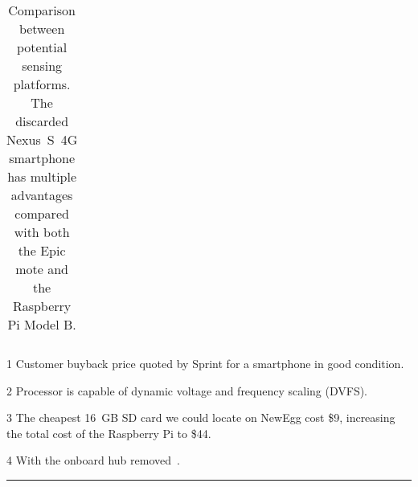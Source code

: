 \begin{table*}[t]
\begin{threeparttable}
{\begin{tabularx}{\textwidth}{rXXX}
\end{tabularx}
}
{\tiny
\begin{tablenotes}
\item [1] Customer buyback price quoted by Sprint for a smartphone in good
condition.
\item [2] Processor is capable of dynamic voltage and frequency scaling
(DVFS).
\item [3] The cheapest 16~GB SD card we could locate on NewEgg cost \$9,
increasing the total cost of the Raspberry Pi to \$44.

\item [4] With the onboard hub removed~\cite{rpipower-url}.

\end{tablenotes}
}

\vspace*{-0.1in}

\caption{Comparison between potential sensing platforms. \textnormal{The
discarded Nexus~S~4G smartphone has multiple advantages compared with both
the Epic mote and the Raspberry Pi Model B.}}

\vspace*{0.1in}
\hrule
\vspace*{-0.2in}

\end{threeparttable}
\label{table-comparison}
\end{table*}
